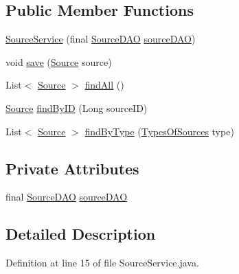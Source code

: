\subsection*{Public Member Functions}
\begin{DoxyCompactItemize}
\item 
\hyperlink{classbr_1_1usp_1_1cata_1_1service_1_1_source_service_a498ed04642e77b9eb8e318ec36d4875e}{Source\+Service} (final \hyperlink{classbr_1_1usp_1_1cata_1_1dao_1_1_source_d_a_o}{Source\+D\+A\+O} \hyperlink{classbr_1_1usp_1_1cata_1_1service_1_1_source_service_ad005c4ce9dc8f8cf934f3555e4a4a97c}{source\+D\+A\+O})
\item 
void \hyperlink{classbr_1_1usp_1_1cata_1_1service_1_1_source_service_a8c2d40307ecbdf97d1f3fafbc5ca2d78}{save} (\hyperlink{classbr_1_1usp_1_1cata_1_1model_1_1_source}{Source} source)
\item 
List$<$ \hyperlink{classbr_1_1usp_1_1cata_1_1model_1_1_source}{Source} $>$ \hyperlink{classbr_1_1usp_1_1cata_1_1service_1_1_source_service_a55b5f33d22565a7b66a2e1857bac0aac}{find\+All} ()
\item 
\hyperlink{classbr_1_1usp_1_1cata_1_1model_1_1_source}{Source} \hyperlink{classbr_1_1usp_1_1cata_1_1service_1_1_source_service_a0e432c0c48eec8d7c20e0cbe19cd4369}{find\+By\+I\+D} (Long source\+I\+D)
\item 
List$<$ \hyperlink{classbr_1_1usp_1_1cata_1_1model_1_1_source}{Source} $>$ \hyperlink{classbr_1_1usp_1_1cata_1_1service_1_1_source_service_ace33255b59c9d8bd230f3b63b13eef69}{find\+By\+Type} (\hyperlink{enumbr_1_1usp_1_1cata_1_1model_1_1_types_of_sources}{Types\+Of\+Sources} type)
\end{DoxyCompactItemize}
\subsection*{Private Attributes}
\begin{DoxyCompactItemize}
\item 
final \hyperlink{classbr_1_1usp_1_1cata_1_1dao_1_1_source_d_a_o}{Source\+D\+A\+O} \hyperlink{classbr_1_1usp_1_1cata_1_1service_1_1_source_service_ad005c4ce9dc8f8cf934f3555e4a4a97c}{source\+D\+A\+O}
\end{DoxyCompactItemize}


\subsection{Detailed Description}


Definition at line 15 of file Source\+Service.\+java.



